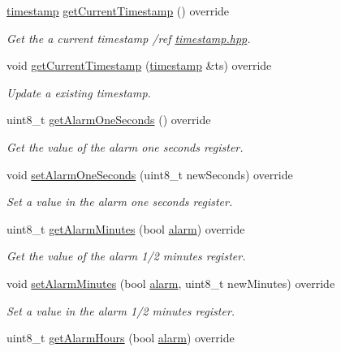 \begin{DoxyCompactItemize}
\mbox{\hyperlink{classtimestamp}{timestamp}} \mbox{\hyperlink{class_d_s3231_a04e087a918d2d48b0cdd2e3c6c2f595f}{get\+Current\+Timestamp}} () override
\begin{DoxyCompactList}\small\item\em Get the a current timestamp /ref \mbox{\hyperlink{timestamp_8hpp_source}{timestamp.\+hpp}}. \end{DoxyCompactList}\item 
void \mbox{\hyperlink{class_d_s3231_ad94d54ed265fb5b911b4281f0103b0b0}{get\+Current\+Timestamp}} (\mbox{\hyperlink{classtimestamp}{timestamp}} \&ts) override
\begin{DoxyCompactList}\small\item\em Update a existing timestamp. \end{DoxyCompactList}\item 
uint8\+\_\+t \mbox{\hyperlink{class_d_s3231_afd2b16482de8abc10981fdfca0e181a6}{get\+Alarm\+One\+Seconds}} () override
\begin{DoxyCompactList}\small\item\em Get the value of the alarm one seconds register. \end{DoxyCompactList}\item 
void \mbox{\hyperlink{class_d_s3231_ae294f3c8c8634a058846cf9864ccc5c8}{set\+Alarm\+One\+Seconds}} (uint8\+\_\+t new\+Seconds) override
\begin{DoxyCompactList}\small\item\em Set a value in the alarm one seconds register. \end{DoxyCompactList}\item 
uint8\+\_\+t \mbox{\hyperlink{class_d_s3231_ae11a0dcc34e9c8a9b875989172339957}{get\+Alarm\+Minutes}} (bool \mbox{\hyperlink{classalarm}{alarm}}) override
\begin{DoxyCompactList}\small\item\em Get the value of the alarm 1/2 minutes register. \end{DoxyCompactList}\item 
void \mbox{\hyperlink{class_d_s3231_a9c1f5b183c24f3062c1c8c299f46023c}{set\+Alarm\+Minutes}} (bool \mbox{\hyperlink{classalarm}{alarm}}, uint8\+\_\+t new\+Minutes) override
\begin{DoxyCompactList}\small\item\em Set a value in the alarm 1/2 minutes register. \end{DoxyCompactList}\item 
uint8\+\_\+t \mbox{\hyperlink{class_d_s3231_a8dc2f4546600209d16f109764c2f4434}{get\+Alarm\+Hours}} (bool \mbox{\hyperlink{classalarm}{alarm}}) override

\end{DoxyCompactItemize}
